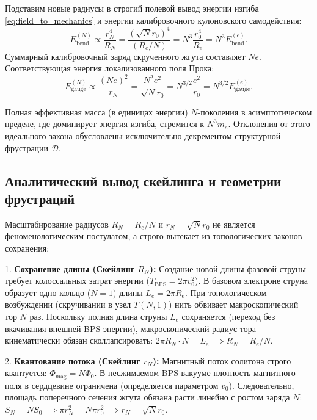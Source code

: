 \documentclass[11pt,a4paper]{article}
\begin{document}
Подставим новые радиусы в строгий полевой вывод энергии изгиба \eqref{eq:field_to_mechanics} и энергии калибровочного кулоновского самодействия:
\begin{equation}
	E_{\text{bend}}^{(N)} \propto \frac{r_N^4}{R_N} = \frac{(\sqrt{N} r_0)^4}{(R_e / N)} = N^3 \frac{r_0^4}{R_e} = N^3 E_{\text{bend}}^{(e)}.
\end{equation}
Суммарный калибровочный заряд скрученного жгута составляет $N e$. Соответствующая энергия локализованного поля Прока:
\begin{equation}
	E_{\text{gauge}}^{(N)} \propto \frac{(Ne)^2}{r_N} = \frac{N^2 e^2}{\sqrt{N} r_0} = N^{3/2} \frac{e^2}{r_0} = N^{3/2} E_{\text{gauge}}^{(e)}.
\end{equation}

Полная эффективная масса (в единицах энергии) $N$-поколения в асимптотическом пределе, где доминирует энергия изгиба, стремится к $N^3 m_e$. Отклонения от этого идеального закона обусловлены исключительно декрементом структурной фрустрации $\mathcal{D}$.
	
\subsection{Аналитический вывод скейлинга и геометрии фрустраций}
Масштабирование радиусов $R_N = R_e/N$ и $r_N = \sqrt{N}r_0$ не является феноменологическим постулатом, а строго вытекает из топологических законов сохранения:

1. \textbf{Сохранение длины (Скейлинг $R_N$):} Создание новой длины фазовой струны требует колоссальных затрат энергии ($T_{\text{BPS}} = 2\pi v_0^2$). В базовом электроне струна образует одно кольцо ($N=1$) длины $L_e = 2\pi R_e$. При топологическом возбуждении (скручивании в узел $T(N,1)$) нить обвивает макроскопический тор $N$ раз. Поскольку полная длина струны $L_e$ сохраняется (переход без вкачивания внешней BPS-энергии), макроскопический радиус тора кинематически обязан сколлапсировать: $2\pi R_N \cdot N = L_e \implies R_N = R_e/N$.

2. \textbf{Квантование потока (Скейлинг $r_N$):} Магнитный поток солитона строго квантуется: $\Phi_{\text{mag}} = N \Phi_0$. В несжимаемом BPS-вакууме плотность магнитного поля в сердцевине ограничена (определяется параметром $v_0$). Следовательно, площадь поперечного сечения жгута обязана расти линейно с ростом заряда $N$: $S_N = N S_0 \implies \pi r_N^2 = N \pi r_0^2 \implies r_N = \sqrt{N} r_0$.
\end{document}
